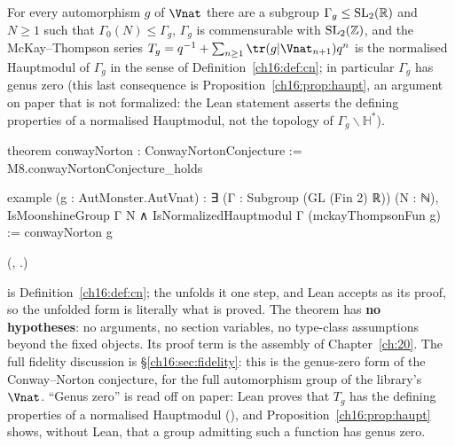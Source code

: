 \begin{theorem}\label{ch16:thm:conwayNorton}
For every automorphism $g$ of $\Vnat$ there are a subgroup $\Gamma_g\le\mathrm{SL}_2(\mathbb{R})$ and $N\ge1$ such that
$\Gamma_0(N)\le\Gamma_g$, $\Gamma_g$ is commensurable with $\mathrm{SL}_2(\mathbb{Z})$, and the McKay--Thompson series
$T_g=q^{-1}+\sum_{n\ge1}\tr(g|\Vnat_{n+1})q^n$ is the normalised Hauptmodul of $\Gamma_g$ in the sense of Definition~\ref{ch16:def:cn}; in particular $\Gamma_g$ has
genus zero (this last consequence is Proposition~\ref{ch16:prop:haupt}, an argument on paper that is not formalized:
the Lean statement asserts the defining properties of a normalised Hauptmodul, not the topology of
$\Gamma_g\backslash\mathbb H^{*}$).
\end{theorem}
\begin{leancode}
theorem conwayNorton : ConwayNortonConjecture :=
  M8.conwayNortonConjecture_holds

example (g : AutMonster.AutVnat) : ∃ (Γ : Subgroup (GL (Fin 2) ℝ)) (N : ℕ), IsMoonshineGroup Γ N ∧
    IsNormalizedHauptmodul Γ (mckayThompsonFun g) :=
  conwayNorton g
\end{leancode}
(, .)
\begin{dictionary}
 is Definition~\ref{ch16:def:cn}; the  unfolds it one step, and Lean accepts
 as its proof, so the unfolded form is literally what is proved.  The theorem has \textbf{no
hypotheses}: no arguments, no section variables, no type-class assumptions beyond the fixed objects.  Its proof term
 is the assembly of Chapter~\ref{ch:20}.  The full fidelity discussion is
\S\ref{ch16:sec:fidelity}: this is the genus-zero form of the Conway--Norton conjecture, for the full automorphism group
of the library's $\Vnat$.  ``Genus zero'' is read off on paper: Lean proves that $T_g$ has the defining properties of
a normalised Hauptmodul (), and Proposition~\ref{ch16:prop:haupt} shows, without Lean, that
a group admitting such a function has genus zero.
\end{dictionary}
